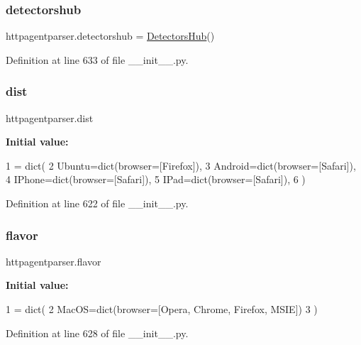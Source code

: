 \subsubsection{\texorpdfstring{detectorshub}{detectorshub}}
{\footnotesize\ttfamily httpagentparser.\+detectorshub = \hyperlink{classhttpagentparser_1_1_detectors_hub}{Detectors\+Hub}()}



Definition at line 633 of file \+\_\+\+\_\+init\+\_\+\+\_\+.\+py.

\hypertarget{namespacehttpagentparser_ae3fc597468692739d473b075ee345c54}{}\label{namespacehttpagentparser_ae3fc597468692739d473b075ee345c54} 
\subsubsection{\texorpdfstring{dist}{dist}}
{\footnotesize\ttfamily httpagentparser.\+dist}

{\bfseries Initial value\+:}
\begin{DoxyCode}
1 =  dict(
2         Ubuntu=dict(browser=[Firefox]),
3         Android=dict(browser=[Safari]),
4         IPhone=dict(browser=[Safari]),
5         IPad=dict(browser=[Safari]),
6     )
\end{DoxyCode}


Definition at line 622 of file \+\_\+\+\_\+init\+\_\+\+\_\+.\+py.

\hypertarget{namespacehttpagentparser_a8206c9d0eb055ea2653b65868d5915bb}{}\label{namespacehttpagentparser_a8206c9d0eb055ea2653b65868d5915bb} 
\subsubsection{\texorpdfstring{flavor}{flavor}}
{\footnotesize\ttfamily httpagentparser.\+flavor}

{\bfseries Initial value\+:}
\begin{DoxyCode}
1 =  dict(
2         MacOS=dict(browser=[Opera, Chrome, Firefox, MSIE])
3     )
\end{DoxyCode}


Definition at line 628 of file \+\_\+\+\_\+init\+\_\+\+\_\+.\+py.

\hypertarget{namespacehttpagentparser_a95aaca9fc3022b6e444891570fc9a3f5}{}\label{namespacehttpagentparser_a95aaca9fc3022b6e444891570fc9a3f5} 
